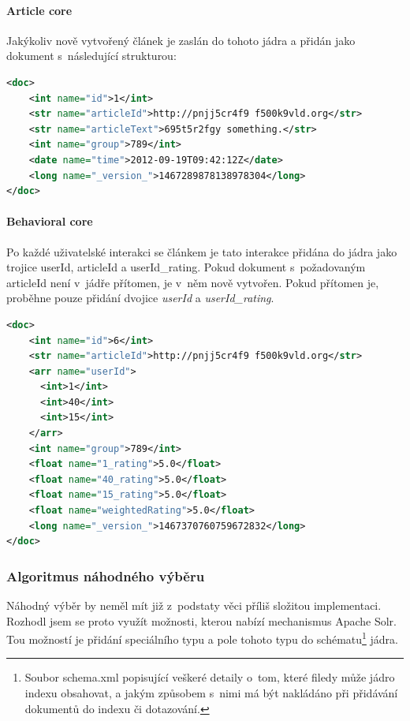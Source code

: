 \documentclass[thesis=M,czech]{FITthesis}[2014/05/07]
\begin{document}
\paragraph{Article core}
Jakýkoliv nově vytvořený článek je zaslán do tohoto jádra a přidán jako dokument s~následující strukturou:

\begin{lstlisting}[language=xml]
 <doc>
    <int name="id">1</int>
    <str name="articleId">http://pnjj5cr4f9 f500k9vld.org</str>
    <str name="articleText">695t5r2fgy something.</str>
    <int name="group">789</int>
    <date name="time">2012-09-19T09:42:12Z</date>
    <long name="_version_">1467289878138978304</long>
</doc>
\end{lstlisting}

\paragraph{Behavioral core}
Po každé uživatelské interakci se článkem je tato interakce přidána do jádra jako trojice userId, articleId a userId\_rating. Pokud dokument s~požadovaným articleId není v~jádře přítomen, je v~něm nově vytvořen. Pokud přítomen je, proběhne pouze přidání dvojice \emph{userId} a \emph{userId\_rating}.

\begin{lstlisting}[language=xml]
<doc>
    <int name="id">6</int>
    <str name="articleId">http://pnjj5cr4f9 f500k9vld.org</str>
    <arr name="userId">
      <int>1</int>
      <int>40</int>      
      <int>15</int>      
    </arr>
    <int name="group">789</int>
    <float name="1_rating">5.0</float>
    <float name="40_rating">5.0</float>
    <float name="15_rating">5.0</float>        
    <float name="weightedRating">5.0</float>
    <long name="_version_">1467370760759672832</long>
</doc>
\end{lstlisting}

\subsubsection{Algoritmus náhodného výběru}
Náhodný výběr by neměl mít již z~podstaty věci příliš složitou implementaci. Rozhodl jsem se proto využít možnosti, kterou nabízí mechanismus Apache Solr. Tou možností je přidání speciálního typu a pole tohoto typu do schématu\footnote{Soubor schema.xml popisující veškeré detaily o~tom, které filedy může jádro indexu obsahovat, a jakým způsobem s~nimi má být nakládáno při přidávání dokumentů do indexu či dotazování.} jádra. 
\end{document}
